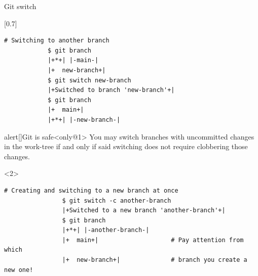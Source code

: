 \documentclass[usenames,svgnames,14pt]{beamer}
\begin{document}
\begin{frame}[fragile]{Git switch}
    \begin{overlayarea}{\textwidth}{0.8\textheight}
        \begin{varblock}{}[0.7\textwidth]{}
        \end{varblock}
        \begin{lstlisting}[style=MyBash]
            # Switching to another branch
            $ git branch
            |+*+| |-main-|
            |+  new-branch+|
            $ git switch new-branch
            |+Switched to branch 'new-branch'+|
            $ git branch
            |+  main+|
            |+*+| |-new-branch-|
        \end{lstlisting}
        \begin{varblock}{alert}[\textwidth]{Git is safe}<only@1>
            \small
            You may switch branches with uncommitted changes in the work-tree if and only if said switching does not require clobbering those changes.
        \end{varblock}
        \begin{onlyenv}<2>
            \begin{lstlisting}[style=MyBash]
                # Creating and switching to a new branch at once
                $ git switch -c another-branch
                |+Switched to a new branch 'another-branch'+|
                $ git branch
                |+*+| |-another-branch-|
                |+  main+|                    # Pay attention from which
                |+  new-branch+|              # branch you create a new one!
            \end{lstlisting}
        \end{onlyenv}
    \end{overlayarea}
\end{frame}
\end{document}
